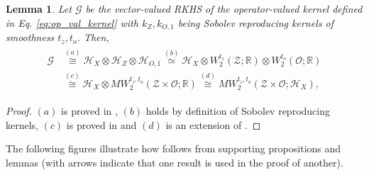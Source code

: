 \documentclass[11pt]{article}
\newcommand{\calZ}{\mathcal{Z}}
\newcommand{\calH}{\mathcal{H}}
\newcommand{\calG}{\mathcal{G}}
\newcommand{\calO}{\mathcal{O}}
\newcommand{\0}{\mathbf{0}}
\newtheorem{lem}{Lemma}[section]
\begin{document}
\begin{appendix}
\begin{lem}\label{lem:equivalence_G}
    Let $\calG$ be the vector-valued RKHS of the operator-valued kernel defined in Eq. \eqref{eq:op_val_kernel} with $k_{Z}, k_{O, 1}$ being Sobolev reproducing kernels of smoothness $t_z, t_o$. Then, 
\begin{align}\label{eq:equivalence_RKHS_sobolev_space}
\begin{aligned}
    \calG &\overset{(a)}{\cong} \calH_{X} \otimes \calH_{Z} \otimes \calH_{O,1} \overset{(b)}{\simeq} \calH_{X} \otimes W^{t_z}_2(\calZ;\mathbb{R}) \otimes W^{t_o}_2(\calO;\mathbb{R}) \\
    &\overset{(c)}{\cong} \calH_{X} \otimes MW^{t_z, t_o}_2(\calZ\times\calO;\mathbb{R}) \overset{(d)}{\cong} MW^{t_z,t_o}_2(\calZ\times\calO;\calH_{X}),
\end{aligned}
\end{align}
\end{lem}
\begin{proof}
    $(a)$ is proved in \citet[Theorem 1]{JMLR:v25:23-1663}, $(b)$ holds by definition of Sobolev reproducing kernels, $(c)$ is proved in \citet[Theorem 12.7.2]{aubin2011applied} and $(d)$ is an extension of \citet[Theorem 12.7.1, Theorem 12.4.1]{aubin2011applied}. 
\end{proof}%
\newpage
\begin{center}
    {\LARGE {}}
\end{center}
The following figures illustrate how  follows from supporting propositions and lemmas (with arrows indicate that one result is used in the proof of another).
\begin{figure}[!ht]
\centering
{}
\end{figure}
\end{appendix}
\end{document}
